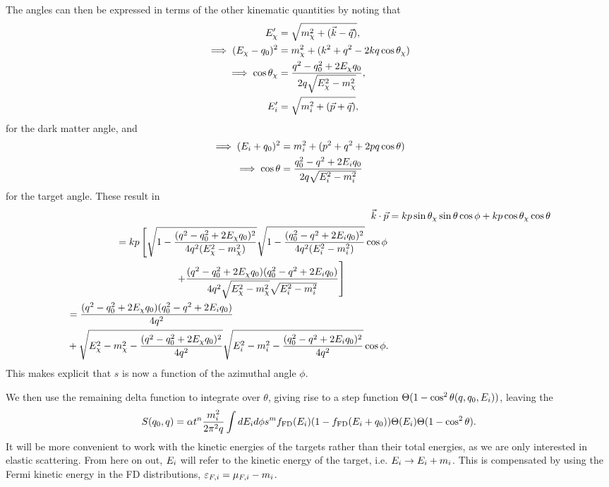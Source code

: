 The angles can then be expressed in terms of the other kinematic quantities by noting that
\begin{align}
  E'_\chi & = \sqrt{m_\chi^2 + (\vec{k} - \vec{q})},\\
  \implies (E_\chi - q_0)^2  & = m_\chi^2 + (k^2 +q^2 -2 k q \cos\theta_\chi)\\
  \implies \cos\theta_\chi &= \frac{q^2 - q_0^2 +2 E_\chi q_0}{2 q \sqrt{E_\chi^2 - m_\chi^2}},\\
  E_i' & = \sqrt{m_i^2 + (\vec{p} + \vec{q})},\\
\end{align}
for the dark matter angle, and 
\begin{align}
  \implies (E_i + q_0)^2  & = m_i^2 + (p^2 +q^2 +2 p q \cos\theta)\\
  \implies \cos\theta &= \frac{q_0^2 - q^2 +2 E_i q_0}{2 q \sqrt{E_i^2 - m_i^2}}\label{eq:cosn}
\end{align}
for the target angle.
These result in
\begin{align}
    \vec{k}\cdot \vec{p} & = kp\sin\theta_\chi\sin\theta\cos\phi + k p \cos\theta_\chi \cos\theta\\
    \begin{split}
        & = kp\left[ \sqrt{1  - \frac{(q^2 - q_0^2 +2 E_\chi q_0)^2}{4 q^2 (E_\chi^2 - m_\chi^2)}}\sqrt{1 - \frac{(q_0^2 - q^2 +2 E_i q_0)^2}{4 q^2 (E_i^2 - m_i^2)}}\cos\phi \right. \\
        &\hspace{6em} \left. + \frac{(q^2 - q_0^2 + 2E_\chi q_0)(q_0^2 - q^2 +2 E_i q_0)}{4 q^2 \sqrt{E_\chi^2 -m_\chi^2}\sqrt{E_i^2 -m_i^2}} \right]
    \end{split}\\
    \begin{split}
        & = \frac{(q^2 - q_0^2 + 2E_\chi q_0)(q_0^2 - q^2 +2 E_i q_0)}{4 q^2}\\ 
        &+ \sqrt{E_\chi^2 - m_\chi^2  - \frac{(q^2 - q_0^2 +2 E_\chi q_0)^2}{4 q^2 }}\sqrt{E_i^2 - m_i^2 - \frac{(q_0^2 - q^2 +2 E_i q_0)^2}{4 q^2 }}\cos\phi.
    \end{split}
\end{align}
This makes explicit that $s$ is now a function of the azimuthal angle $\phi$. 

We then use the remaining delta function to integrate over $\theta$, giving rise to a step function $ \Theta(1-\cos^2\theta(q,q_0,E_i))$, leaving the 
\begin{equation}
S(q_0,q) = \alpha t^n \frac{m_i^2}{2\pi^2 q}\int dE_i d\phi s^m  f_{\rm FD}(E_i)(1-f_{\rm FD}(E_i+q_0))\Theta(E_i)  \Theta(1-\cos^2\theta).
\end{equation}
It will be more convenient to work with the kinetic energies of the targets rather than their total energies, as we are only interested in elastic scattering. From here on out, $E_i$ will refer to the kinetic energy of the target, i.e. $E_i\rightarrow E_i + m_i$. This is compensated by using the Fermi kinetic energy in the FD distributions, $\varepsilon_{F,i} = \mu_{F,i} - m_i$.

